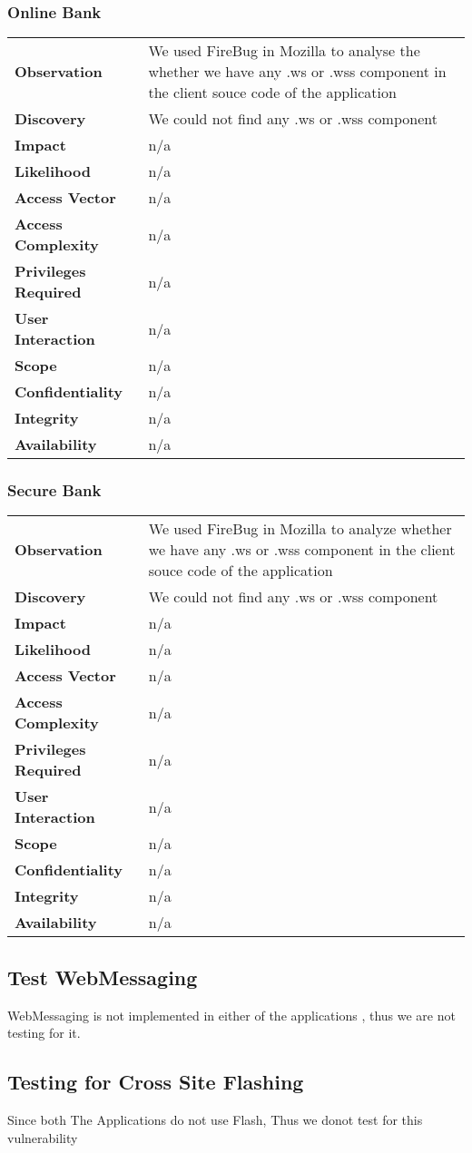 \subsubsection{Online Bank}
\begin{tabular}{l|p{10cm}}
\textbf{Observation} & We used FireBug in Mozilla to analyse the whether we have any .ws or .wss component in the client souce code of the application   \\
\textbf{Discovery} & We could not find any .ws or .wss component \\
\textbf{Impact} &  n/a\\
\textbf{Likelihood} & n/a \\
\textbf{Access Vector} & n/a \\
\textbf{Access Complexity} & n/a \\
\textbf{Privileges Required} & n/a \\
\textbf{User Interaction} & n/a \\
\textbf{Scope} & n/a \\
\textbf{Confidentiality} & n/a \\
\textbf{Integrity} & n/a \\
\textbf{Availability} & n/a \\
\end{tabular}

\subsubsection{Secure Bank}
\begin{tabular}{l|p{10cm}}
\textbf{Observation} &  We used FireBug in Mozilla to analyze whether we have any .ws or .wss component in the client souce code of the application  \\
\textbf{Discovery} & We could not find any .ws or .wss component \\
\textbf{Impact} &  n/a\\
\textbf{Likelihood} & n/a \\
\textbf{Access Vector} & n/a \\
\textbf{Access Complexity} & n/a \\
\textbf{Privileges Required} & n/a \\
\textbf{User Interaction} & n/a \\
\textbf{Scope} & n/a \\
\textbf{Confidentiality} & n/a \\
\textbf{Integrity} & n/a \\
\textbf{Availability} & n/a \\
\end{tabular}

\subsection{Test WebMessaging}
WebMessaging is not implemented in either of the applications , thus we are not testing for it.

\subsection{Testing for Cross Site Flashing}
Since both The Applications do not use Flash, Thus we donot test for this vulnerability
